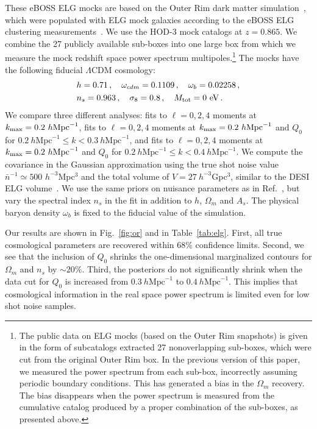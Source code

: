 \documentclass[12pt,a4paper]{article}
\newcommand{\be}{\begin{equation}}
\newcommand{\ee}{\end{equation}}
\newcommand\hMpc{h\text{Mpc}^{-1}}
\renewcommand{\L}{\Lambda}
\newcommand{\kmax}{k_{\rm max}}
\begin{document}
These eBOSS ELG mocks are based on the Outer Rim dark matter simulation~\cite{Heitmann:2019ytn}, which were populated with ELG mock galaxies according 
to the eBOSS ELG clustering measurements~\cite{Avila:2020rmp}. 
We use the HOD-3 mock catalogs at $z=0.865$.
We combine the 27 publicly available sub-boxes into 
one large box from which we measure the mock redshift space power spectrum multipoles.\footnote{The public data on ELG mocks (based on the Outer Rim 
snapshots) is given in the form of subcatalogs 
extracted 27 nonoverlapping sub-boxes, which were cut from the original 
Outer Rim box. In the previous version of this paper, we measured the 
power spectrum from each sub-box, incorrectly assuming periodic 
boundary conditions. This has generated a bias in the $\Omega_m$ recovery.
The bias disappears when the power spectrum is measured from the cumulative catalog
produced by a proper combination of the sub-boxes, as presented above.}
The mocks have the following fiducial 
$\L$CDM
cosmology:
\be
\begin{split}
& h=0.71\,,\quad \omega_{cdm}=0.1109\,,\quad  \omega_b = 0.02258\,,\\
& n_s= 0.963\,,\quad \sigma_8 = 0.8\,, \quad M_{\rm tot}=0~\text{eV}\,.
\end{split} 
\ee
We compare three different 
analyses: fits to $\ell=0,2,4$ moments at $\kmax=0.2~\hMpc$,
fits to $\ell=0,2,4$ moments at $\kmax=0.2~\hMpc$ and $Q_0$ 
for $0.2~\hMpc\leq k<0.3~\hMpc$, and fits to 
$\ell=0,2,4$ moments at $\kmax=0.2~\hMpc$ and $Q_0$ 
for $0.2~\hMpc\leq k<0.4~\hMpc$. 
We compute the covariance in the Gaussian approximation using 
the true shot noise value $\bar n^{-1}\simeq 500$ $h^{-3}$Mpc$^{3}$
and the total volume of $V=27~h^{-3}$Gpc$^3$,
similar to the DESI ELG volume~\cite{Aghamousa:2016zmz}. 
We use the same priors on nuisance parameters as in Ref.~\cite{Ivanov:2021zmi},
but vary the spectral index $n_s$ in the fit in addition to 
$h$, $\Omega_m$ and $A_s$. 
The physical baryon density 
$\omega_b$ is fixed to the fiducial value of the simulation.

Our results are shown in Fig.~\ref{fig:or} and in Table~\ref{tab:elg}. 
First, all true cosmological parameters are 
recovered within $68\%$ confidence limits.
Second, we see that the inclusion 
of $Q_0$ shrinks the one-dimensional marginalized contours
for $\Omega_m$ and $n_s$ by $\sim 20\%$.
Third, the
posteriors do not significantly shrink 
when the data cut for $Q_0$ is increased from $0.3~\hMpc$
to $0.4~\hMpc$. 
This implies that cosmological information
in the real space power spectrum is limited
even for low shot noise samples.
\end{document}
